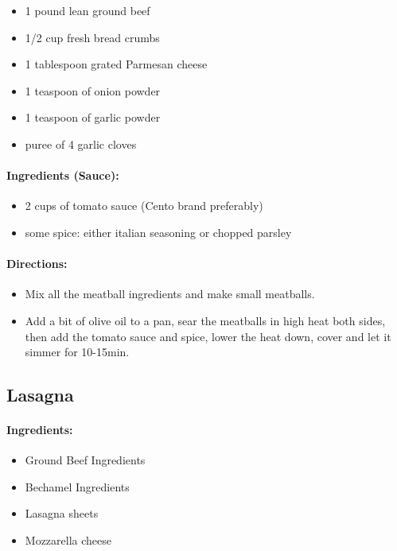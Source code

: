 \documentclass{article}
\begin{document}
\begin{itemize}
	\item 1 pound lean ground beef 
	\item 1/2 cup fresh bread crumbs 
	\item 1 tablespoon grated Parmesan cheese 
	\item 1 teaspoon of onion powder
	\item 1 teaspoon of garlic powder
	\item puree of 4 garlic cloves 
\end{itemize}

\paragraph{Ingredients (Sauce):}
\begin{itemize}
	\item 2 cups of tomato sauce (Cento brand preferably)
	\item some spice: either italian seasoning or chopped parsley
\end{itemize}

\paragraph{Directions:}
\begin{itemize}
	\item Mix all the meatball ingredients and make small meatballs.
	\item Add a bit of olive oil to a pan, sear the meatballs in high heat both sides, then add the tomato sauce and spice, lower the heat down, cover and let it simmer for 10-15min.
\end{itemize}

\subsection{Lasagna}

\paragraph{Ingredients:}

\begin{itemize}
  \item Ground Beef Ingredients
  \item Bechamel Ingredients
  \item Lasagna sheets
  \item Mozzarella cheese
\end{itemize}
\end{document}
